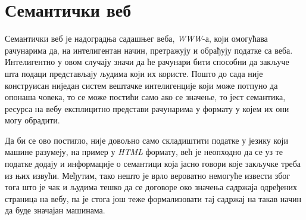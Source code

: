 \documentclass[12pt,oneside]{memoir}
\begin{document}






\section{Семантички веб}
\label{sec:semantic_veb_main}

Семантички веб је надоградња садашњег веба, \textit{WWW}-а, који омогућава рачунарима да, на интелигентан начин, претражују и обрађују податке са веба. Интелигентно у овом случају значи да ће рачунари бити способни да закључе шта подаци представљају људима који их користе. Пошто до сада није конструисан ниједан систем вештачке интелигенције који може потпуно да опонаша човека, то се може постићи само ако се значење, то јест семантика, ресурса на вебу експлицитно представи рачунарима у формату у којем их они могу обрадити. \cite{semantic}

Да би се ово постигло, није довољно само складиштити податке у језику који машине разумеју, на пример у \textit{HTML} формату, већ је неопходно да се уз те податке додају и информације о семантици која јасно говори које закључке треба из њих извући. Међутим, тако нешто је врло вероватно немогуће извести због тога што је чак и људима тешко да се договоре око значења садржаја одређених страница на вебу, па је стога још теже формализовати тај садржај на такав начин да буде значајан машинама. \cite{semantic}
\end{document}
